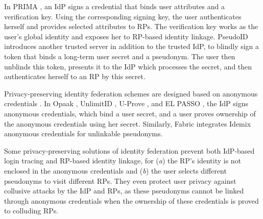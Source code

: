In PRIMA \cite{prima}, an IdP signs a credential
that binds user attributes and  a verification key.
Using the corresponding signing key, the user authenticates herself and provides selected attributes to RPs. The verification key works as the user's global identity and exposes her to RP-based identity linkage.
PseudoID \cite{PseudoID} introduces another trusted server in addition to the trusted IdP,
 to blindly sign \cite{blind-sign}
a token that binds a long-term user secret and a pseudonym.
The user then unblinds this token,
        presents it to the IdP which processes the secret,
    and then authenticates herself to an RP by this secret.

Privacy-preserving identity federation schemes are designed based on anonymous credentials \cite{anon-credential-2001, idemix, anon-credential}.
In Opaak \cite{Opaak}, UnlimitID \cite{UnlimitID}, U-Prove \cite{uprov}, and EL PASSO \cite{ELPASSO}, the IdP signs anonymous credentials, which bind a user secret, %
and a user proves ownership of the anonymous credentials using her secret.
Similarly, Fabric \cite{hyperledge-idemix} integrates Idemix anonymous credentials \cite{idemix} for unlinkable pseudonyms. %


Some privacy-preserving solutions of identity federation \cite{PseudoID,ELPASSO,UnlimitID,Opaak,uprov,hyperledge-idemix} prevent both IdP-based login tracing and RP-based identity linkage, for (\emph{a}) the RP's identity is not enclosed in the anonymous credentials and (\emph{b}) the user selects different pseudonyms to visit different RPs.
They even protect user privacy against collusive attacks by the IdP and RPs, as these pseudonyms cannot be linked through anonymous credentials \cite{anon-credential-2001, idemix, anon-credential} when the ownership of these credentials is proved to colluding RPs. %

%

